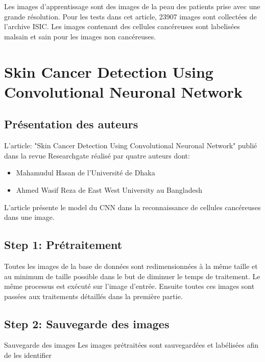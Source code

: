 \documentclass[12pt, letterpaper]{article}
\begin{document}
\par Les images d’apprentissage sont des images de la peau des patients prise avec une grande résolution. Pour les tests dans cet article, 23907 images sont collectées de l’archive ISIC. Les images contenant des cellules cancéreuses sont labelisées malsain et sain pour les images non cancéreuses. 

\section{Skin Cancer Detection Using Convolutional Neuronal Network} 

\subsection{Présentation des auteurs}
\par L’article: "Skin Cancer Detection Using Convolutional Neuronal Network" publié dans la revue Researchgate réalisé par quatre auteurs dont:
\begin{itemize}
		\item Mahamudul Hasan de l’Université de Dhaka
		\item Ahmed Wasif Reza de East West University au Bangladesh
\end{itemize}
L’article présente le model du CNN dans la reconnaissance de cellules cancéreuses dans une image.
\subsection{Step 1: Prétraitement}
\par Toutes les images de la base de données sont redimensionnées à la même taille et au minimum de taille possible dans le but de diminuer le temps de traitement. Le même processus est exécuté sur l’image d’entrée. Ensuite toutes ces images sont passées aux traitements détaillés dans la première partie.
\subsection{Step 2: Sauvegarde des images}
\par Sauvegarde des images
Les images prétraitées sont sauvegardées et labélisées afin de les identifier
\end{document}
